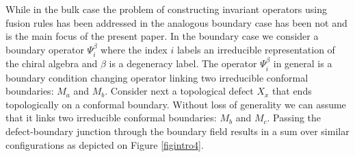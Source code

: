 \documentclass[a4paper,11pt]{article}
\theoremstyle{plain}
\theoremstyle{definition}
\begin{document}
While in the bulk case the problem of constructing invariant operators using  fusion rules has been addressed in  \cite{Buican} the analogous boundary case has been not and is the main focus of the present paper. In the boundary case we consider a boundary operator $\Psi_i^\beta$ where the index $i$ labels an irreducible representation of the chiral algebra and $\beta$ is a degeneracy label. The operator $\Psi_i^\beta$ in general is a boundary condition changing operator 
linking two irreducible conformal boundaries: $M_a$ and $M_{b}$. Consider next a topological defect $X_{x}$ that ends topologically on a conformal 
boundary. Without loss of generality we can assume that it links two irreducible conformal boundaries: $M_b$ and $M_{c}$.
Passing the defect-boundary junction through the boundary field results in a sum over similar configurations as depicted on Figure \ref{figintro4}.
\end{document}
